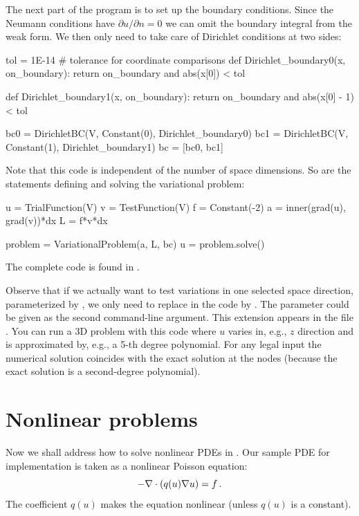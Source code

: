 The next part of the program is to set up the boundary conditions.
Since the Neumann conditions have $\partial u/\partial n=0$ we can
omit the boundary integral from the weak form. We then only
need to take care of Dirichlet conditions at two sides:
\begin{python}
tol = 1E-14   # tolerance for coordinate comparisons
def Dirichlet_boundary0(x, on_boundary):
    return on_boundary and abs(x[0]) < tol

def Dirichlet_boundary1(x, on_boundary):
    return on_boundary and abs(x[0] - 1) < tol

bc0 = DirichletBC(V, Constant(0), Dirichlet_boundary0)
bc1 = DirichletBC(V, Constant(1), Dirichlet_boundary1)
bc = [bc0, bc1]
\end{python}
Note that this code is independent of the number of space dimensions.
So are the statements defining and solving
the variational problem:
\begin{python}
u = TrialFunction(V)
v = TestFunction(V)
f = Constant(-2)
a = inner(grad(u), grad(v))*dx
L = f*v*dx

problem = VariationalProblem(a, L, bc)
u = problem.solve()
\end{python}
The complete code is found in .

Observe that if we actually want to test variations in one selected
space direction, parameterized by ,
we only need to replace  in the
code by . The parameter
 could be given as the second
command-line argument.  This extension appears in the file
.  You can run a 3D
problem with this code where $u$ varies in, e.g., $z$ direction and is
approximated by, e.g., a 5-th degree polynomial.  For any legal input
the numerical solution coincides with the exact solution at the nodes
(because the exact solution is a second-degree polynomial).

\section{Nonlinear problems}
\label{langtangen:poisson:nonlinear}
\label{nonlinear PDEs}

Now we shall address how to solve nonlinear PDEs in \fenics. Our
sample PDE for implementation is taken as a nonlinear Poisson
equation:
\begin{equation}
-\nabla\cdot\left( q(u)\nabla u\right) = f\thinspace .
\end{equation}
The coefficient $q(u)$ makes the equation nonlinear (unless $q(u)$
is a constant).

